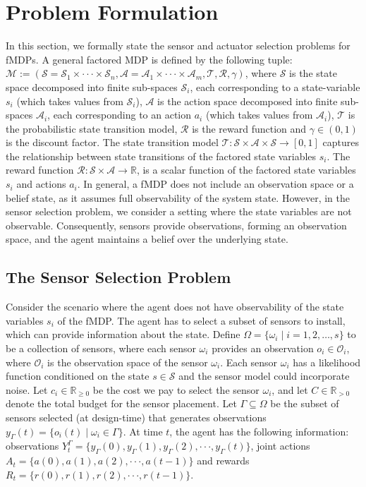 \documentclass[twocolumn]{autart}    %
\begin{document}
\section{Problem Formulation}
In this section, we formally state the sensor and actuator selection problems for fMDPs.
A general factored MDP is defined by the following tuple: $\mathcal{M} :=(\mathcal{S} = \mathcal{S}_1  \times \cdot \cdot \cdot \times \mathcal{S}_n,\mathcal{A} = \mathcal{A}_1 \times \cdot \cdot \cdot \times \mathcal{A}_m, \mathcal{T}, \mathcal{R},  \gamma)$, where $\mathcal{S}$ is the state space decomposed into finite sub-spaces $\mathcal{S}_i$, each corresponding to a state-variable $s_i$ (which takes values from $\mathcal{S}_i$), $\mathcal{A}$ is the action space decomposed into finite sub-spaces $\mathcal{A}_i$, each corresponding to an action $a_i$ (which takes values from $\mathcal{A}_i$), $\mathcal{T}$ is the probabilistic state transition model, $\mathcal{R}$ is the reward function and $\gamma \in (0,1)$ is the discount factor. The state transition model $\mathcal{T}: \mathcal{S} \times \mathcal{A} \times \mathcal{S} \rightarrow [0,1] $ captures the relationship between state transitions of the factored state variables $s_i$. The reward function $\mathcal{R}: \mathcal{S} \times \mathcal{A} \rightarrow \mathbb{R}$, is a scalar function of the factored state variables $s_i$ and actions $a_i$. In general, a fMDP does not include an observation space or a belief state, as it assumes full observability of the system state. However, in the sensor selection problem, we consider a setting where the state variables are not observable. Consequently, sensors provide observations, forming an observation space, and the agent maintains a belief over the underlying state.

\subsection{The Sensor Selection Problem}
Consider the scenario where the agent does not have observability of the state variables $s_i$ of the fMDP. The agent has to select a subset of sensors to install, which can provide information about the state. Define $\Omega = \{\omega_i \mid i = 1,2,\hdots,s\}$ to be a collection of sensors, where each sensor $\omega_i$ provides an observation $o_i \in \mathcal{O}_i$, where $\mathcal{O}_i$ is the observation space of the sensor $\omega_i$. Each sensor $\omega_i$ has a likelihood function conditioned on the state $s \in \mathcal{S}$ and the sensor model could incorporate noise. Let $c_i \in \mathbb{R}_{\geq 0}$ be the cost we pay to select the sensor $\omega_i$, and let $C \in \mathbb{R}_{> 0}$ denote the total budget for the sensor placement. Let $\Gamma \subseteq \Omega$ be the subset of sensors selected (at design-time) that generates observations $y_{\Gamma}(t) = \{o_i(t) \mid \omega_i \in \Gamma \}$. 
 At time $t$, the agent has the following information: observations $Y^{\Gamma}_t = \{y_\Gamma (0), y_\Gamma (1), y_\Gamma (2), \cdot \cdot \cdot, y_\Gamma (t)\} $, joint actions $A_t = \{a(0), a(1), a(2), \cdot \cdot \cdot, a(t-1)\}$ and rewards $R_t = \{r(0), r(1), r(2), \cdot \cdot \cdot, r(t-1)\}$. \\
 
\end{document}
